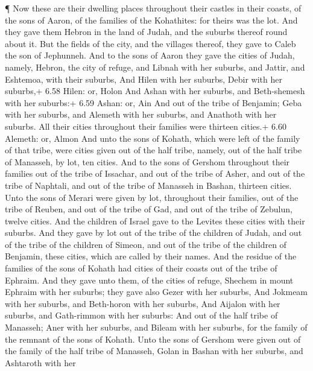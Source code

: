  ¶ Now these are their dwelling places throughout their
castles in their coasts, of the sons of Aaron, of the families of the
Kohathites: for theirs was the lot.  And they gave them
Hebron in the land of Judah, and the suburbs thereof round about it.
 But the fields of the city, and the villages thereof, they
gave to Caleb the son of Jephunneh.  And to the sons of
Aaron they gave the cities of Judah, namely, Hebron, the city of refuge,
and Libnah with her suburbs, and Jattir, and Eshtemoa, with their
suburbs,  And Hilen with her suburbs, Debir with her
suburbs,+ 6.58 Hilen: or, Holon  And Ashan with her
suburbs, and Beth-shemesh with her suburbs:+ 6.59 Ashan: or, Ain
 And out of the tribe of Benjamin; Geba with her suburbs,
and Alemeth with her suburbs, and Anathoth with her suburbs. All their
cities throughout their families were thirteen cities.+ 6.60 Alemeth:
or, Almon  And unto the sons of Kohath, which were left of
the family of that tribe, were cities given out of the half tribe,
namely, out of the half tribe of Manasseh, by lot, ten cities.
 And to the sons of Gershom throughout their families out
of the tribe of Issachar, and out of the tribe of Asher, and out of the
tribe of Naphtali, and out of the tribe of Manasseh in Bashan, thirteen
cities.  Unto the sons of Merari were given by lot,
throughout their families, out of the tribe of Reuben, and out of the
tribe of Gad, and out of the tribe of Zebulun, twelve cities.
 And the children of Israel gave to the Levites these
cities with their suburbs.  And they gave by lot out of the
tribe of the children of Judah, and out of the tribe of the children of
Simeon, and out of the tribe of the children of Benjamin, these cities,
which are called by their names.  And the residue of the
families of the sons of Kohath had cities of their coasts out of the
tribe of Ephraim.  And they gave unto them, of the cities
of refuge, Shechem in mount Ephraim with her suburbs; they gave also
Gezer with her suburbs,  And Jokmeam with her suburbs, and
Beth-horon with her suburbs,  And Aijalon with her suburbs,
and Gath-rimmon with her suburbs:  And out of the half
tribe of Manasseh; Aner with her suburbs, and Bileam with her suburbs,
for the family of the remnant of the sons of Kohath.  Unto
the sons of Gershom were given out of the family of the half tribe of
Manasseh, Golan in Bashan with her suburbs, and Ashtaroth with her
